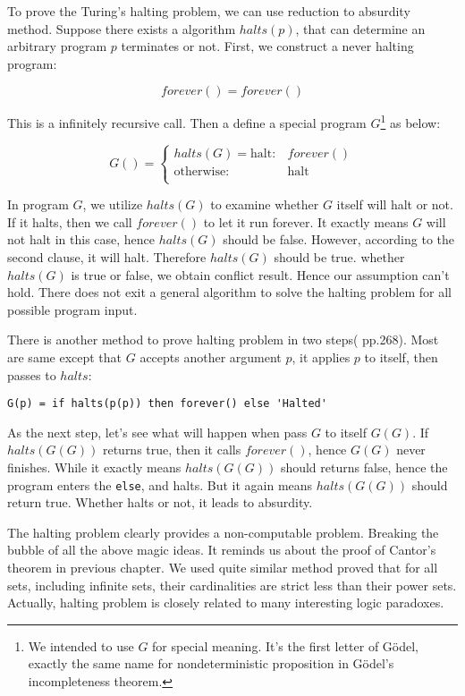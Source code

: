 \documentclass{article}
\begin{document}
To prove the Turing's halting problem, we can use reduction to absurdity method. Suppose there exists a algorithm $halts(p)$, that can determine an arbitrary program $p$ terminates or not. First, we construct a never halting program:

\[
forever() = forever()
\]

This is a infinitely recursive call. Then a define a special program $G$\footnote{We intended to use $G$ for special meaning. It's the first letter of Gödel, exactly the same name for nondeterministic proposition in Gödel's incompleteness theorem.} as below:

\[
G() = \begin{cases}
halts(G) = \text{halt}: & forever() \\
\text{otherwise}: & \text{halt} \\
\end{cases}
\]

In program $G$, we utilize $halts(G)$ to examine whether $G$ itself will halt or not. If it halts, then we call $forever()$ to let it run forever. It exactly means $G$ will not halt in this case, hence $halts(G)$ should be false. However, according to the second clause, it will halt. Therefore $halts(G)$ should be true. whether $halts(G)$ is true or false, we obtain conflict result. Hence our assumption can't hold. There does not exit a general algorithm to solve the halting problem for all possible program input.

There is another method to prove halting problem in two steps(\cite{SICP} pp.268). Most are same except that $G$ accepts another argument $p$, it applies $p$ to itself, then passes to $halts$:

\lstset{frame=single}
\begin{lstlisting}
G(p) = if halts(p(p)) then forever() else 'Halted'
\end{lstlisting}

As the next step, let's see what will happen when pass $G$ to itself $G(G)$. If $halts(G(G))$ returns true, then it calls $forever()$, hence $G(G)$ never finishes. While it exactly means $halts(G(G))$ should returns false, hence the program enters the \texttt{else}, and halts. But it again means $halts(G(G))$ should return true. Whether halts or not, it leads to absurdity.

The halting problem clearly provides a non-computable problem. Breaking the bubble of all the above magic ideas. It reminds us about the proof of Cantor's theorem in previous chapter. We used quite similar method proved that for all sets, including infinite sets, their cardinalities are strict less than their power sets. Actually, halting problem is closely related to many interesting logic paradoxes.
\end{document}
